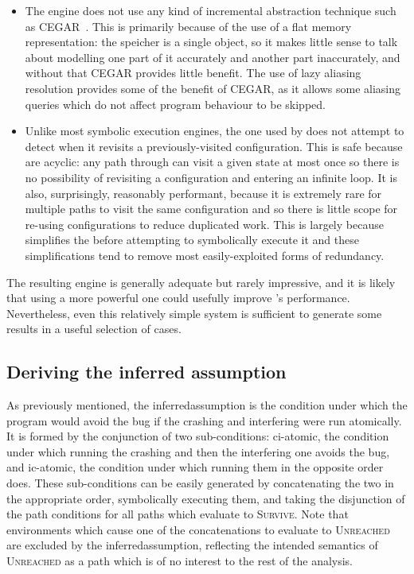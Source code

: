 \begin{itemize}
\item The engine does not use any kind of incremental abstraction
  technique such as CEGAR~\cite{Clarke2003}.  This is primarily
  because of the use of a flat memory representation: the speicher is
  a single object, so it makes little sense to talk about modelling
  one part of it accurately and another part inaccurately, and without
  that CEGAR provides little benefit.  The use of lazy aliasing
  resolution provides some of the benefit of CEGAR, as it allows some
  aliasing queries which do not affect program behaviour to be
  skipped.

\item Unlike most symbolic execution engines, the one used by
  {\implementation} does not attempt to detect when it revisits a
  previously-visited configuration.  This is safe because
  {\StateMachines} are acyclic: any path through {\AStateMachine} can
  visit a given state at most once so there is no possibility of
  revisiting a configuration and entering an infinite loop.  It is
  also, surprisingly, reasonably performant, because it is extremely
  rare for multiple paths to visit the same configuration and so there
  is little scope for re-using configurations to reduce duplicated
  work.  This is largely because {\technique} simplifies the
  {\StateMachine} before attempting to symbolically execute it and
  these simplifications tend to remove most easily-exploited forms of
  redundancy.
\end{itemize}
The resulting engine is generally adequate but rarely impressive, and
it is likely that using a more powerful one could usefully improve
{\implementation}'s performance.  Nevertheless, even this relatively
simple system is sufficient to generate some results in a useful
selection of cases.

\subsection{Deriving the inferred assumption}
\label{sect:derive:inferred_assumption}

As previously mentioned, the \gls{inferredassumption} is the condition
under which the program would avoid the bug if the crashing and
interfering {\StateMachines} were run atomically.  It is formed by the
conjunction of two sub-conditions: \gls{ci-atomic}, the condition
under which running the crashing {\StateMachine} and then the
interfering one avoids the bug, and \gls{ic-atomic}, the condition
under which running them in the opposite order does.  These
sub-conditions can be easily generated by concatenating the two
{\StateMachines} in the appropriate order, symbolically executing
them, and taking the disjunction of the path conditions for all paths
which evaluate to \textsc{Survive}.  Note that {\StateMachine}
environments which cause one of the concatenations to evaluate to
\textsc{Unreached} are excluded by the \gls{inferredassumption},
reflecting the intended semantics of \textsc{Unreached} as a path
which is of no interest to the rest of the analysis.

